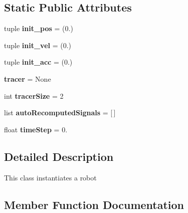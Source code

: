 \subsection*{Static Public Attributes}
\begin{DoxyCompactItemize}
\item 
tuple {\bfseries init\+\_\+pos} = (0.)\hypertarget{classrobot_1_1Robot_a72835f96d0dfcdfe1b2d4feddfa727d2}{}\label{classrobot_1_1Robot_a72835f96d0dfcdfe1b2d4feddfa727d2}

\item 
tuple {\bfseries init\+\_\+vel} = (0.)\hypertarget{classrobot_1_1Robot_ab50d0c91e1751573073a937ef9df4dad}{}\label{classrobot_1_1Robot_ab50d0c91e1751573073a937ef9df4dad}

\item 
tuple {\bfseries init\+\_\+acc} = (0.)\hypertarget{classrobot_1_1Robot_ada231c72c7967d3f61083316224fa965}{}\label{classrobot_1_1Robot_ada231c72c7967d3f61083316224fa965}

\item 
{\bfseries tracer} = None\hypertarget{classrobot_1_1Robot_adda6f00aaeb6562a2cc9d682cbcdb478}{}\label{classrobot_1_1Robot_adda6f00aaeb6562a2cc9d682cbcdb478}

\item 
int {\bfseries tracer\+Size} = 2\hypertarget{classrobot_1_1Robot_a29af80c65f6ad9e61fae2cf76d81b9e0}{}\label{classrobot_1_1Robot_a29af80c65f6ad9e61fae2cf76d81b9e0}

\item 
list {\bfseries auto\+Recomputed\+Signals} = \mbox{[}$\,$\mbox{]}\hypertarget{classrobot_1_1Robot_ab11ca34e29d7aac471df46b6fe56e7a9}{}\label{classrobot_1_1Robot_ab11ca34e29d7aac471df46b6fe56e7a9}

\item 
float {\bfseries time\+Step} = 0.\hypertarget{classrobot_1_1Robot_a4e690827b25920c0088890fbeea1667b}{}\label{classrobot_1_1Robot_a4e690827b25920c0088890fbeea1667b}

\end{DoxyCompactItemize}


\subsection{Detailed Description}
\begin{DoxyVerb}This class instantiates a robot
\end{DoxyVerb}
 

\subsection{Member Function Documentation}
